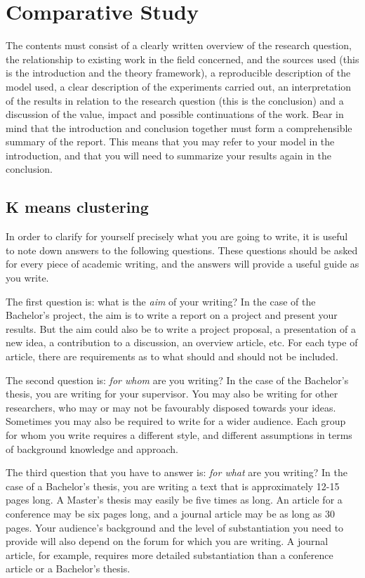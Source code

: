 
\section{Comparative Study}\label{sec:contents}
The contents must consist of a clearly written overview of the research question, the relationship to existing work in the field concerned, and the sources used (this is the introduction and the theory framework), a reproducible description of the model used, a clear description of the experiments carried out, an interpretation of the results in relation to the research question (this is the conclusion) and a discussion of the value, impact and possible continuations of the work.
Bear in mind that the introduction and conclusion together must form a comprehensible summary of the report.
This means that you may refer to your model in the introduction, and that you will need to summarize your results again in the conclusion.

\subsection{K means clustering}\label{sec:_before_you_start}
In order to clarify for yourself precisely what you are going to write, it is useful to note down answers to the following questions.
These questions should be asked for every piece of academic writing, and the answers will provide a useful guide as you write.

The first question is: what is the \textit{aim} of your writing?
In the case of the Bachelor's project, the aim is to write a report on a project and present your results.
But the aim could also be to write a project proposal, a presentation of a new idea, a contribution to a discussion, an overview article, etc.
For each type of article, there are requirements as to what should and should not be included.

The second question is: \textit{for whom} are you writing? In the case of the Bachelor's thesis, you are writing for your supervisor.
You may also be writing for other researchers, who may or may not be favourably disposed towards your ideas.
Sometimes you may also be required to write for a wider audience.
Each group for whom you write requires a different style, and different assumptions in terms of background knowledge and approach.

The third question that you have to answer is: \textit{for what} are you writing?
In the case of a Bachelor's thesis, you are writing a text that is approximately 12-15 pages long.
A Master's thesis may easily be five times as long.
An article for a conference may be six pages long, and a journal article may be as long as 30 pages.
Your audience's background and the level of substantiation you need to provide will also depend on the forum for which you are writing.
A journal article, for example, requires more detailed substantiation than a conference article or a Bachelor's thesis.

